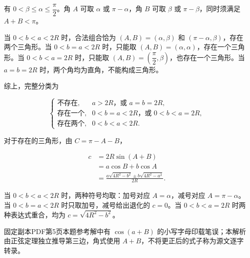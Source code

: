 \begin{answer}
有 $0<\beta\le\alpha\le\dfrac\pi2$。角 $A$ 可取 $\alpha$ 或 $\pi-\alpha$，角 $B$ 可取 $\beta$ 或 $\pi-\beta$，同时须满足 $A+B<\pi$。

当 $0<b<a<2R$ 时，合法组合恰为 $(A,B)=(\alpha,\beta)$ 和 $(\pi-\alpha,\beta)$，存在两个三角形。当 $0<b=a<2R$ 时，只能取 $(A,B)=(\alpha,\alpha)$，存在一个三角形。当 $0<b<a=2R$ 时，只能取 $(A,B)=(\dfrac\pi2,\beta)$，也存在一个三角形。当 $a=b=2R$ 时，两个角均为直角，不能构成三角形。

综上，完整分类为

\nopagebreak[4]
\[
\begin{cases}
\text{不存在},&a>2R\text{，或 }a=b=2R,\\
\text{存在一个},&0<b=a<2R\text{，或 }0<b<a=2R,\\
\text{存在两个},&0<b<a<2R.
\end{cases}
\]

对于存在的三角形，由 $C=\pi-A-B$，

\nopagebreak[4]
\[
\begin{aligned}
c&=2R\sin(A+B)\\
 &=a\cos B+b\cos A\\
 &=\frac{a\sqrt{4R^2-b^2}\pm b\sqrt{4R^2-a^2}}{2R}.
\end{aligned}
\]

当 $0<b<a<2R$ 时，两种符号均取：加号对应 $A=\alpha$，减号对应 $A=\pi-\alpha$。当 $0<b=a<2R$ 时只取加号，减号给出退化的 $c=0$。当 $0<b<a=2R$ 时两种表达式重合，均为 $c=\sqrt{4R^2-b^2}$。

固定副本PDF第5页本题参考解中有 $\cos(a+B)$ 的小写字母印载笔误；本解析由正弦定理独立推导第三边，角式使用 $A+B$，不将更正后的式子称为源文逐字转录。




\end{answer}
